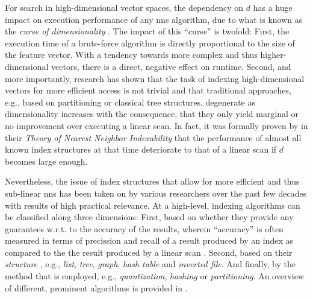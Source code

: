 For search in high-dimensional vector spaces, the dependency on $d$ has a huge impact on execution performance of any \acrshort{nns} algorithm, due to what is known as the \emph{curse of dimensionality} \cite{Indyk1998:Approximate,Zezula:2006Similarity}. The impact of this ``curse'' is twofold: First, the execution time of a brute-force algorithm is directly proportional to the size of the feature vector. With a tendency towards more complex and thus higher-dimensional vectors, there is a direct, negative effect on runtime. Second, and more importantly, research has shown that the task of indexing high-dimensional vectors for more efficient access is not trivial and that traditional approaches, e.g., based on partitioning or classical tree structures, degenerate as dimensionality increases \cite{Indyk1998:Approximate,Weber:1998Va} with the consequence, that they only yield marginal or no improvement over executing a linear scan. In fact, it was formally proven by \cite{Shaft:2006Theory} in their \emph{Theory of Nearest Neighbor Indexability} that the performance of almost all known index structures at that time deteriorate to that of a linear scan if $d$ becomes large enough.

Nevertheless, the issue of index structures that allow for more efficient and thus sub-linear \acrshort{nns} has been taken on by various researchers over the past few decades with results of high practical relevance. At a high-level, indexing algorithms can be classified along three dimensions: First, based on whether they provide any guarantees w.r.t. to the accuracy of the results, wherein ``accuracy'' is often measured in terms of precission and recall of a result produced by an index as compared to the the result produced by a linear scan \cite{Echihabi:2021High}. Second, based on their \emph{structure} \cite{Shaft:2006Theory}, e.g., \emph{list}, \emph{tree}, \emph{graph}, \emph{hash table} and \emph{inverted file}. And finally, by the method that is employed, e.g., \emph{quantization}, \emph{hashing} or \emph{partitioning}. An overview of different, prominent algorithms is provided in .

